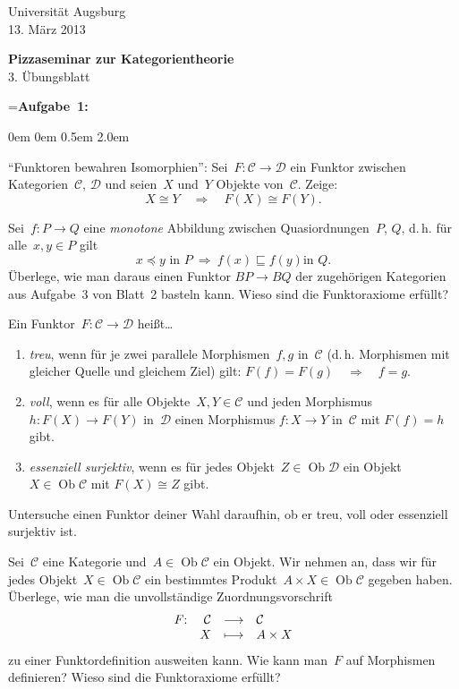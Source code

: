 \documentclass[a4paper,ngerman]{scrartcl}
\theoremstyle{definition}
\theoremstyle{plain}
\theoremstyle{remark}
\newcommand{\C}{\mathcal{C}}
\newcommand{\D}{\mathcal{D}}
\DeclareMathOperator{\Ob}{Ob}
\begin{document}
\vspace*{-4em}
\begin{flushright}Universität Augsburg \\ 13. März 2013\end{flushright}

\begin{center}\Large \textbf{Pizzaseminar zur Kategorientheorie} \\
3. Übungsblatt
\end{center}
\vspace{1.5em}

\newbox{\mybox}
\setbox\mybox=\hbox{\textbf{Aufgabe 1:}}

\begin{list}{}{0em \leftmargin0em \itemindent0.5em \itemsep 2.0em}
\item[\textbf{Aufgabe 1:}]
"`Funktoren bewahren Isomorphien"':
Sei~$F : \C \to \D$ ein Funktor zwischen Kategorien~$\C$, $\D$ und seien~$X$
und~$Y$ Objekte von~$\C$. Zeige:
\[ X \cong Y \quad\Longrightarrow\quad F(X) \cong F(Y). \]

\item[\textbf{Aufgabe 2:}]
Sei~$f:P \to Q$ eine \emph{monotone} Abbildung zwischen Quasiordnungen~$P$,
$Q$, d.\,h. für alle~$x,y \in P$ gilt
\[ \text{$x \preceq y$ in $P$} \ \Longrightarrow\ \text{$f(x) \sqsubseteq f(y)$
in~$Q$}. \]
Überlege, wie man daraus einen Funktor $BP \to BQ$ der zugehörigen Kategorien
aus Aufgabe~3 von Blatt~2 basteln kann. Wieso sind die Funktoraxiome erfüllt?

\item[\textbf{Aufgabe 3:}]
Ein Funktor~$F : \C \to \D$ heißt\ldots
\begin{enumerate}
\item \emph{treu}, wenn für je zwei parallele Morphismen~$f,g$ in~$\C$ (d.\,h.
Morphismen mit gleicher Quelle und gleichem Ziel) gilt:
$F(f) = F(g) \quad\Longrightarrow\quad f = g.$
\item \emph{voll}, wenn es für alle Objekte~$X,Y \in \C$ und jeden
Morphismus~$h : F(X) \to F(Y)$ in~$\D$ einen Morphismus $f:X \to Y$ in~$\C$
mit $F(f) = h$ gibt.
\item \emph{essenziell surjektiv}, wenn es für jedes Objekt~$Z \in \Ob \D$ ein
Objekt~$X \in \Ob \C$ mit
$F(X) \cong Z$ gibt.
\end{enumerate}
Untersuche einen Funktor deiner Wahl daraufhin, ob er treu, voll oder essenziell
surjektiv ist.

\item[\textbf{Aufgabe 4:}]
Sei~$\C$ eine Kategorie und~$A \in \Ob \C$ ein Objekt. Wir nehmen an, dass wir
für jedes Objekt~$X \in \Ob \C$ ein bestimmtes Produkt~$A \times X \in \Ob \C$
gegeben haben. Überlege, wie man die unvollständige Zuordnungsvorschrift
\[ \begin{array}{@{}rrcl@{}}
  F{:} & \C &\longrightarrow& \C \\
  & X &\longmapsto& A \times X
\end{array} \]
zu einer Funktordefinition ausweiten kann. Wie kann man~$F$ auf Morphismen
definieren? Wieso sind die Funktoraxiome erfüllt?


\end{list}
\end{document}
